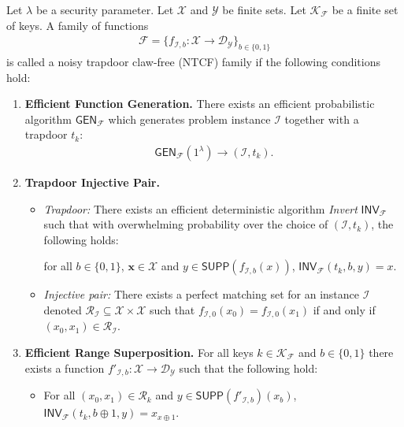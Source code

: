\begin{defn}
   Let $\lambda$ be a security parameter. Let $\mathcal{X}$ and $\mathcal{Y}$ be finite sets. Let $\mathcal{K}_{\mathcal{F}}$ be a finite set of keys. A family of functions
   \begin{align}
       \mathcal{F}=\{f_{\mathcal{I},b}:\mathcal{X}\to \mathcal{D}_{\mathcal{Y}}\}_{b\in\{0,1\}}
   \end{align}
is called a noisy trapdoor claw-free (NTCF) family if the following conditions hold:
\begin{enumerate}
    \item \textbf{Efficient Function Generation.} There exists an efficient probabilistic algorithm $\mathsf{GEN}_{\mathcal{F}}$ which generates problem instance $\mathcal{I}$ together with a trapdoor $t_{k}$:
    \begin{align}
        \mathsf{GEN}_{\mathcal{F}}(1^{\lambda})\to (\mathcal{I},t_k).
    \end{align}
    \item \textbf{Trapdoor Injective Pair.}
    \begin{itemize}
        \item \textit{Trapdoor:} There exists an efficient deterministic algorithm \textit{Invert} $\mathsf{INV}_\mathcal{F}$ such that with overwhelming probability over the choice of $(\mathcal{I},t_k)$, the following holds:
        \begin{center}
            for all $b\in\{0,1\}$, $\mathbf{x}\in \mathcal{X}$ and $y\in \mathsf{SUPP}(f_{\mathcal{I},b}(x))$, $\mathsf{INV}_\mathcal{F}(t_k,b,y)=x$.
        \end{center}
        \item \textit{Injective pair:} There exists a perfect matching set for an instance $\mathcal{I}$ denoted  $\mathcal{R}_{\mathcal{I}}\subseteq \mathcal{X}\times \mathcal{X}$ such that $f_{\mathcal{I},0}(x_0)=f_{\mathcal{I},0}(x_1)$ if and only if $(x_0,x_1)\in \mathcal{R}_{\mathcal{I}}$. 
    \end{itemize}
    \item \textbf{Efficient Range Superposition.} For all keys $k\in \mathcal{K}_{\mathcal{F}}$ and $b\in\{0,1\}$ there exists a function $f'_{\mathcal{I},b}:\mathcal{X}\to \mathcal{D}_{\mathcal{Y}}$ such that the following hold:
    \begin{itemize}
        \item For all $(x_0,x_1)\in \mathcal{R}_k$ and $y\in\mathsf{SUPP}(f'_{\mathcal{I},b})(x_b)$, $\mathsf{INV}_{\mathcal{F}}(t_k,b\oplus 1,y)=x_{x\oplus 1}$.

\end{itemize}
\end{enumerate}
\end{defn}
